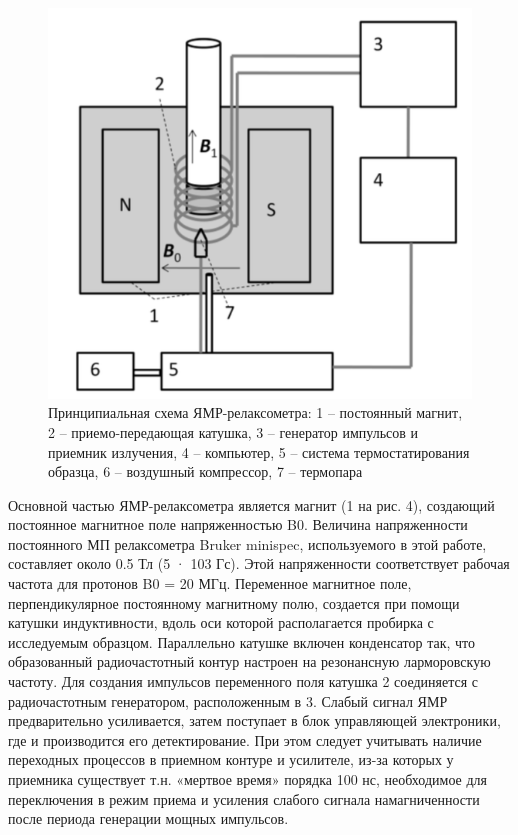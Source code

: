 \documentclass{article}
\begin{document}
\begin{figure}[h!]
    \centering
    \includegraphics[scale = 0.4]{схема.png}
    \caption{Принципиальная схема ЯМР-релаксометра: 1 – постоянный магнит, 2 – приемо-передающая катушка, 3 – генератор импульсов и приемник излучения, 4 – компьютер, 5 – система термостатирования образца, 6 – воздушный компрессор, 7 – термопара}
    \label{fig0}
\end{figure}

Основной частью ЯМР-релаксометра является магнит (1 на рис. 4), создающий постоянное магнитное поле напряженностью B0. Величина напряженности постоянного МП релаксометра Bruker minispec, используемого в этой работе, составляет около 0.5 Тл (5 · 103 Гс). Этой напряженности соответствует рабочая частота для протонов B0 = 20 МГц. 
	Переменное магнитное поле, перпендикулярное постоянному магнитному полю, создается при помощи катушки индуктивности, вдоль оси которой располагается пробирка с исследуемым образцом. Параллельно катушке включен конденсатор так, что образованный радиочастотный контур настроен на резонансную ларморовскую частоту. 
Для создания импульсов переменного поля катушка 2 соединяется с радиочастотным генератором, расположенным в 3. Слабый сигнал ЯМР предварительно усиливается, затем поступает в блок управляющей электроники, где и производится его детектирование. При этом следует учитывать наличие переходных процессов в приемном контуре и усилителе, из-за которых у приемника существует т.н. «мертвое время» порядка 100 нс, необходимое для переключения в режим приема и усиления слабого сигнала намагниченности после периода генерации мощных импульсов. 
\end{document}
